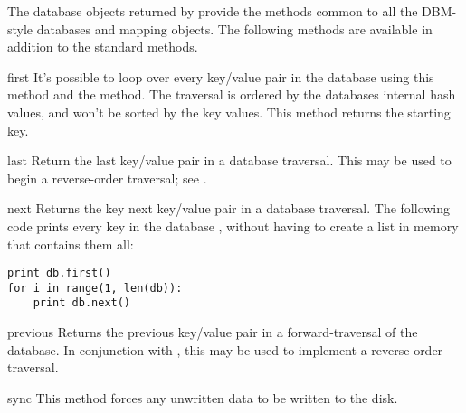 The database objects returned by  provide the methods 
common to all the DBM-style databases and mapping objects.  The following
methods are available in addition to the standard methods.

\begin{methoddesc}[dbhash]{first}{}
  It's possible to loop over every key/value pair in the database using
  this method   and the  method.  The traversal is ordered by
  the databases internal hash values, and won't be sorted by the key
  values.  This method returns the starting key.
\end{methoddesc}

\begin{methoddesc}[dbhash]{last}{}
  Return the last key/value pair in a database traversal.  This may be used to
  begin a reverse-order traversal; see .
\end{methoddesc}

\begin{methoddesc}[dbhash]{next}{}
  Returns the key next key/value pair in a database traversal.  The
  following code prints every key in the database , without
  having to create a list in memory that contains them all:

\begin{verbatim}
print db.first()
for i in range(1, len(db)):
    print db.next()
\end{verbatim}
\end{methoddesc}

\begin{methoddesc}[dbhash]{previous}{}
  Returns the previous key/value pair in a forward-traversal of the database.
  In conjunction with , this may be used to implement
  a reverse-order traversal.
\end{methoddesc}

\begin{methoddesc}[dbhash]{sync}{}
  This method forces any unwritten data to be written to the disk.
\end{methoddesc}
